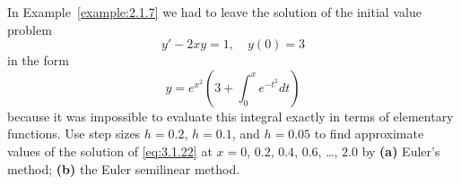 \setcounter{example}{3}
\setcounter{equation}{21}
\begin{example}
  \label{example:3.1.4} \rm In Example~\ref{example:2.1.7} we had to leave the solution of the
  initial value problem
  \begin{equation}
    \label{eq:3.1.22}y'-2xy=1,\quad y(0)=3
  \end{equation}
  in the form
  \begin{equation}
    \label{eq:3.1.23}y=e^{x^{2}}\left(3+\int^{x}_{0}e^{-t^{2}}dt\right)
  \end{equation}
  \noindent
  because it was impossible to evaluate this integral exactly in terms of elementary functions. Use
  step sizes $h=0.2$, $h=0.1$, and $h=0.05$ to find approximate values of the solution of
  \eqref{eq:3.1.22} at $x=0$, $0.2$, $0.4$, $0.6$, \dots, $2.0$ by {\bf (a)} Euler's method; {\bf
  (b)} the Euler semilinear method.
\end{example}
\setcounter{equation}{23}
\setcounter{table}{4}
